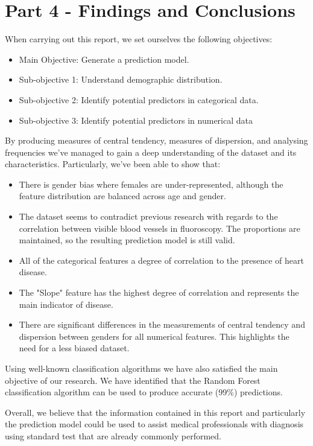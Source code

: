 \section{Part 4 - Findings and Conclusions}

When carrying out this report, we set ourselves the following objectives:

\begin{itemize}
    \item Main Objective: Generate a prediction model.
    \item Sub-objective 1: Understand demographic distribution.
    \item Sub-objective 2: Identify potential predictors in categorical data.
    \item Sub-objective 3: Identify potential predictors in numerical data
\end{itemize}

By producing measures of central tendency, measures of dispersion, and analysing frequencies we've managed 
to gain a deep understanding of the dataset and its characteristics. Particularly, we've been able to show
that:

\begin{itemize}
    \item There is gender bias where females are under-represented, although the feature distribution are balanced across age and gender.
    \item The dataset seems to contradict previous research with regards to the correlation between visible blood vessels in fluoroscopy. The proportions are maintained, so the resulting prediction model is still valid.
    \item All of the categorical features a degree of correlation to the presence of heart disease.
    \item The "Slope" feature has the highest degree of correlation and represents the main indicator of disease.
    \item There are significant differences in the measurements of central tendency and dispersion between genders for all numerical features. This highlights the need for a less biased dataset.
\end{itemize}

Using well-known classification algorithms we have also satisfied the main objective of our research. We have
identified that the Random Forest classification algorithm can be used to produce accurate (99\%) predictions.

Overall, we believe that the information contained in this report and particularly the prediction model could
be used to assist medical professionals with diagnosis using standard test that are already commonly performed.